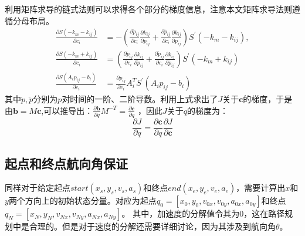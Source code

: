 \documentclass[master,academic]{ysuthesis} %
\begin{document}
		利用矩阵求导的链式法则可以求得各个部分的梯度信息，注意本文矩阵求导法则遵循分母布局。
		\begin{equation}
			\begin{aligned}
				\frac{\partial S( -k_m-k_{ij} )}{\partial c_i}&=-( \frac{\partial \dot{p}_{ij}}{\partial c_i}\frac{\partial k_{ij}}{\partial \dot{p}_{ij}}+\frac{\partial \ddot{p}_{ij}}{\partial c_i}\frac{\partial k_{ij}}{\partial \ddot{p}_{ij}} ) S^{'} ( -k_m-k_{ij} ) ,\\
				\frac{\partial S( -k_m+k_{ij} )}{\partial c_i}&=( \frac{\partial \dot{p}_{ij}}{\partial c_i}\frac{\partial k_{ij}}{\partial \dot{p}_{ij}}+\frac{\partial \ddot{p}_{ij}}{\partial c_i}\frac{\partial k_{ij}}{\partial \ddot{p}_{ij}} ) S^{'} ( -k_m+k_{ij} ) \\
				\frac{\partial S( A_ip_{ij}-b_i )}{\partial c_i}&=\frac{\partial p_{ij}}{\partial c_i}A_{i}^{T}S^{'}( A_ip_{ij}-b_i ) 
			\end{aligned}
		\end{equation}
		其中$\dot{p},\ddot{p}$分别为$p$对时间的一阶、二阶导数。利用上式求出了$J$关于$\mathbf{c}$的梯度，于是由$\mathbf{b} = M\mathbf{c}$,可以推导出：$\frac{\partial \mathbf{b}}{\partial q}M^{-T}=\frac{\partial \mathbf{c}}{\partial q}$ ，因此$J$关于$q$的梯度为：
		\begin{equation}
			\frac{\partial J}{\partial q}=\frac{\partial \mathbf{c}}{\partial q}\frac{\partial J}{\partial \mathbf{c}}
		\end{equation}

		\subsection{起点和终点航向角保证}
		同样对于给定起点$start(x_s,y_s,v_s,a_s)$和终点$end(x_e,y_e,v_e,a_e)$，需要计算出$x$和$y$两个方向上的初始状态分量。对应为起点$q_0=[x_0,y_0,v_{0x},v_{0y},a_{0x},a_{0y}]$和终点$q_N=[x_N,y_N,v_{Nx},v_{Ny},a_{Nx},a_{Ny}]$。 其中，加速度的分解值令其为0，这在路径规划中是合理的。但是对于速度的分解还需要详细讨论，因为其涉及到航向角$\theta$。
\end{document}
